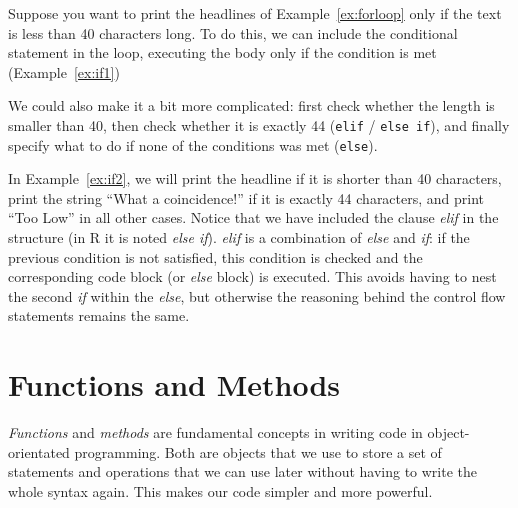 
Suppose you want to print the headlines of Example~\ref{ex:forloop} only if the text is less than 40 characters long.
To do this, we can include the conditional statement in the loop, executing the body only if the condition is met (Example~\ref{ex:if1})


We could also make it a bit more complicated: first check whether the length is smaller than 40,
then check whether it is exactly 44 (\verb|elif| / \verb|else if|), and finally specify what to do if none of the conditions was met (\verb|else|).

In Example~\ref{ex:if2}, we will print the headline if it is shorter than 40 characters,
print the string ``What a coincidence!'' if it is exactly 44 characters, and print ``Too Low'' in all other cases.
Notice that we have included the clause \emph{elif} in the structure (in R it is noted \emph{else if}).
\emph{elif} is a combination of \emph{else} and \emph{if}: if the previous condition is not satisfied,
this condition is checked and the corresponding code block (or \emph{else} block) is executed.
This avoids having to nest the second \emph{if} within the \emph{else}, but otherwise the reasoning behind the control flow statements remains the same.



\section{Functions and Methods}
\label{sec:functions}

\emph{Functions} and \emph{methods} are fundamental concepts in
writing code in object-orientated programming. Both are objects that
we use to store a set of statements and operations that we can use later
without having to write the whole syntax again. This makes our code
simpler and more powerful.

